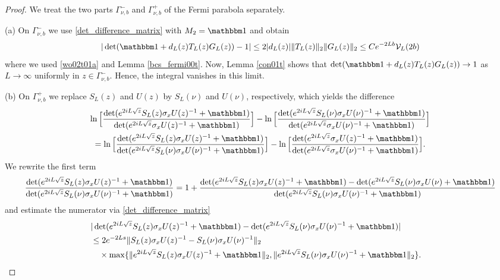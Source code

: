 \begin{proof}
We treat the two parts $\Gamma_{\nu,b}^-$ and $\Gamma_{\nu,b}^+$ of the Fermi parabola separately.

(a) 
On $\Gamma_{\nu,b}^-$ we use \eqref{det_difference_matrix} with $M_2=\id$ and obtain
\begin{equation*}
  |\det(\id+d_L(z) T_L(z)G_L(z)) - 1|
     \leq 2|d_L(z)| \|T_L(z)\|_2 \|G_L(z)\|_2
     \leq C e^{-2Lb} \mathcal{V}_L(2b) 
\end{equation*}
where we used \ref{wo02t01a} and Lemma \ref{bcs_fermi00t}. Now, Lemma \ref{con01t} shows that
$\det(\id+d_L(z) T_L(z)G_L(z))\to 1$ as $L\to\infty$ uniformly in $z\in\Gamma_{\nu,b}^-$. Hence, the integral
vanishes in this limit. 

(b) 
On $\Gamma_{\nu,b}^+$ we replace $S_L(z)$ and $U(z)$ by $S_L(\nu)$ and $U(\nu)$, respectively, which yields
the difference
\begin{multline*}
  \ln\Big[\frac{\det(e^{2iL\sqrt{z}}S_L(z)\sigma_x U(z)^{-1} + \id)}{\det(e^{2iL\sqrt{z}}\sigma_x U(z)^{-1} + \id)}\Big]
   - \ln\Big[\frac{\det(e^{2iL\sqrt{z}}S_L(\nu)\sigma_x U(\nu)^{-1} + \id)}{\det(e^{2iL\sqrt{z}}\sigma_x U(\nu)^{-1} + \id)}\Big]\\
   = \ln\Big[\frac{\det(e^{2iL\sqrt{z}}S_L(z)\sigma_x U(z)^{-1} + \id)}{\det(e^{2iL\sqrt{z}}S_L(\nu)\sigma_x U(\nu)^{-1} + \id)}\Big]
       - \ln\Big[\frac{\det(e^{2iL\sqrt{z}}\sigma_x U(z)^{-1} + \id)}{\det(e^{2iL\sqrt{z}}\sigma_x U(\nu)^{-1} + \id)}\Big].
\end{multline*}
We rewrite the first term
\begin{equation*}
  \frac{\det(e^{2iL\sqrt{z}}S_L(z)\sigma_x U(z)^{-1} + \id)}{\det(e^{2iL\sqrt{z}}S_L(\nu)\sigma_x U(\nu)^{-1} + \id)}
     = 1 + \frac{\det(e^{2iL\sqrt{z}}S_L(z)\sigma_x U(z)^{-1} + \id) 
                  - \det(e^{2iL\sqrt{z}}S_L(\nu)\sigma_x U(\nu) + \id)}{\det(e^{2iL\sqrt{z}}S_L(\nu)\sigma_x U(\nu)^{-1} + \id)}
\end{equation*}
and estimate the numerator via \eqref{det_difference_matrix}
\begin{equation*}
\begin{split}
  \lefteqn{| \det(e^{2iL\sqrt{z}}S_L(z)\sigma_x U(z)^{-1} + \id) - \det(e^{2iL\sqrt{z}}S_L(\nu)\sigma_x U(\nu)^{-1} + \id) |}\\
    & \leq 2 e^{-2Ls}\|S_L(z)\sigma_x U(z)^{-1} - S_L(\nu)\sigma_x U(\nu)^{-1}\|_2 \\
    & \quad \times \max\{ \|e^{2iL\sqrt{z}}S_L(z)\sigma_x U(z)^{-1}+\id\|_2, \|e^{2iL\sqrt{z}}S_L(\nu)\sigma_x U(\nu)^{-1}+\id\|_2 \} .

\end{split}
\end{equation*}
\end{proof}

